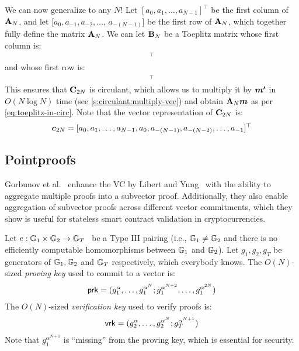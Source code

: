 We can now generalize to any $N$!
Let $[a_0, a_1,\dots, a_{N-1}]^\top$ be the first column of $\mathbf{A}_N$, and let $[a_0, a_{-1}, a_{-2},\dots$, $a_{-(N-1)}]$ be the first row of $\mathbf{A}_N$, which together fully define the matrix $\mathbf{A}_N$.
We can let $\mathbf{B}_N$ be a Toeplitz matrix whose first column is:
\begin{align}
    [a_0,a_{-(N-1)},a_{-(N-2)},\dots,a_{-1}]^\top
\end{align}
and whose first row is:
\begin{align}
    [a_0,a_{N-1},a_{N-2},\dots,a_{1}]^\top
\end{align}
This ensures that $\mathbf{C}_{2N}$ is circulant, which allows us to multiply it by $\bm{m'}$ in $O(N\log{N})$ time (see \cref{s:circulant:multiply-vec}) and obtain $\mathbf{A}_N \bm{m}$ as per \cref{eq:toeplitz-in-circ}.
Note that the vector representation of $\mathbf{C}_{2N}$ is:
\begin{align}
    \bm{c}_{2N} = [a_0, a_1, \dots, a_{N-1}, a_0,a_{-(N-1)},a_{-(N-2)},\dots,a_{-1}]^\top
\end{align}

\subsection{Pointproofs}
\label{s:pointproofs}

Gorbunov et al.~\cite{GRWZ20} enhance the VC by Libert and Yung~\cite{LY10} with the ability to aggregate multiple proofs into a subvector proof.
Additionally, they also enable aggregation of subvector proofs across different vector commitments, which they show is useful for stateless smart contract validation in cryptocurrencies.

Let $e : \mathbb{G}_1 \times \mathbb{G}_2\rightarrow \mathbb{G}_T$~\cite{GPS08} be a Type III pairing (i.e., $\mathbb{G}_1\ne \mathbb{G}_2$ and there is no efficiently computable homomorphisms between $\mathbb{G}_1$ and $\mathbb{G}_2$).
Let $g_1,g_2,g_T$ be generators of $\mathbb{G}_1, \mathbb{G}_2$ and $\mathbb{G}_T$ respectively, which everybody knows.
The $O(N)$-sized \textit{proving key} used to commit to a vector is:
\begin{align}
    \mathsf{prk} = (g_1^{\alpha},\dots, g_1^{\alpha^N}; g_1^{\alpha^{N+2}},\dots, g_1^{\alpha^{2N}})
\end{align}
The $O(N)$-sized \textit{verification key} used to verify proofs is:
\begin{align}
    \mathsf{vrk} = (g_2^{\alpha},\dots,g_2^{\alpha^N}; g_T^{\alpha^{N+1}})
\end{align}
Note that $g_1^{\alpha^{N+1}}$ is ``missing'' from the proving key, which is essential for security.

